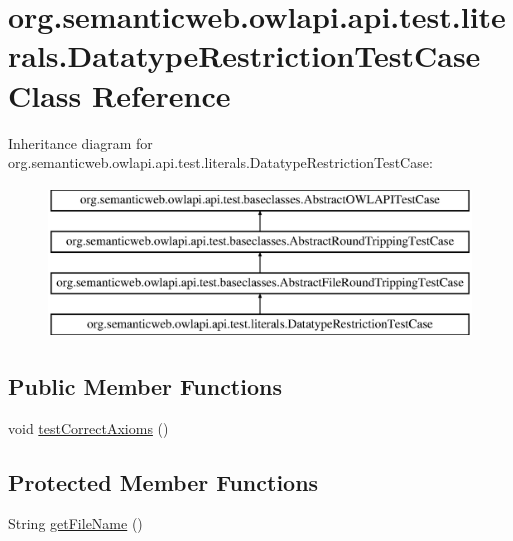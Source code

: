 \hypertarget{classorg_1_1semanticweb_1_1owlapi_1_1api_1_1test_1_1literals_1_1_datatype_restriction_test_case}{\section{org.\-semanticweb.\-owlapi.\-api.\-test.\-literals.\-Datatype\-Restriction\-Test\-Case Class Reference}
\label{classorg_1_1semanticweb_1_1owlapi_1_1api_1_1test_1_1literals_1_1_datatype_restriction_test_case}
}
Inheritance diagram for org.\-semanticweb.\-owlapi.\-api.\-test.\-literals.\-Datatype\-Restriction\-Test\-Case\-:\begin{figure}[H]
\begin{center}
\leavevmode
\includegraphics[height=4.000000cm]{classorg_1_1semanticweb_1_1owlapi_1_1api_1_1test_1_1literals_1_1_datatype_restriction_test_case}
\end{center}
\end{figure}
\subsection*{Public Member Functions}
\begin{DoxyCompactItemize}
\item 
void \hyperlink{classorg_1_1semanticweb_1_1owlapi_1_1api_1_1test_1_1literals_1_1_datatype_restriction_test_case_ac2392b081940c58dc50f3fb2c608461b}{test\-Correct\-Axioms} ()
\end{DoxyCompactItemize}
\subsection*{Protected Member Functions}
\begin{DoxyCompactItemize}
\item 
String \hyperlink{classorg_1_1semanticweb_1_1owlapi_1_1api_1_1test_1_1literals_1_1_datatype_restriction_test_case_aa52479e162d399f7bcff5da75211ae6a}{get\-File\-Name} ()
\end{DoxyCompactItemize}


